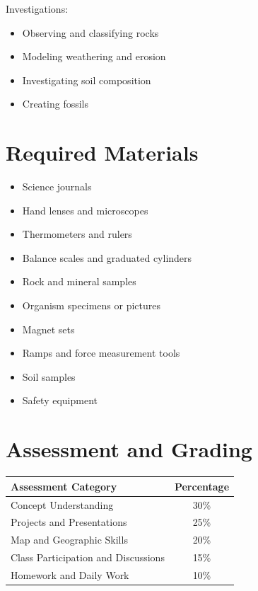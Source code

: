 \documentclass[11pt,letterpaper]{report}
\begin{document}
Investigations:
\begin{itemize}
\item Observing and classifying rocks
\item Modeling weathering and erosion
\item Investigating soil composition
\item Creating fossils
\end{itemize}

\section{Required Materials}

\begin{itemize}
\item Science journals
\item Hand lenses and microscopes
\item Thermometers and rulers
\item Balance scales and graduated cylinders
\item Rock and mineral samples
\item Organism specimens or pictures
\item Magnet sets
\item Ramps and force measurement tools
\item Soil samples
\item Safety equipment
\end{itemize}


\section{Assessment and Grading}

\begin{center}
\begin{tabular}{|l|c|}
\hline
\textbf{Assessment Category} & \textbf{Percentage} \\
\hline
Concept Understanding & 30\% \\
\hline
Projects and Presentations & 25\% \\
\hline
Map and Geographic Skills & 20\% \\
\hline
Class Participation and Discussions & 15\% \\
\hline
Homework and Daily Work & 10\% \\
\hline
\end{tabular}
\end{center}

\clearpage
\end{document}
